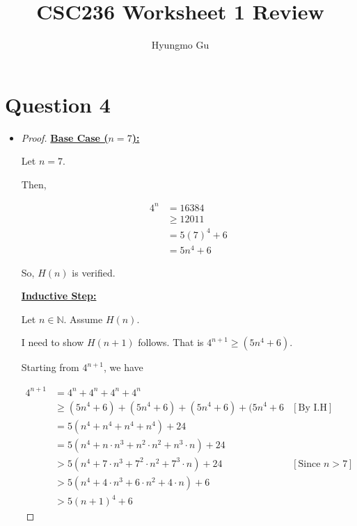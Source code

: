 \documentclass[12pt]{article}
\begin{document}
\title{CSC236 Worksheet 1 Review}
\author{Hyungmo Gu}
\maketitle

\section*{Question 4}
\begin{itemize}
    \item

    \begin{proof}
    \underline{\textbf{Base Case ($n = 7$):}}

    \bigskip

    Let $n = 7$.

    \bigskip

    Then,

    \begin{align}
        4^n &= 16384\\
        &\geq 12011\\
        &= 5(7)^4 + 6\\
        &= 5n^4 + 6
    \end{align}

    \bigskip

    So, $H(n)$ is verified.

    \bigskip

    \underline{\textbf{Inductive Step:}}

    \bigskip

    Let $n \in \mathbb{N}$. Assume $H(n)$.

    \bigskip

    I need to show $H(n+1)$ follows. That is $4^{n+1} \geq (5n^4 + 6)$.

    \bigskip

    Starting from $4^{n+1}$, we have

    \begin{align}
        4^{n+1} &= 4^n + 4^n + 4^n + 4^n\\
        &\geq (5n^4 + 6) + (5n^4 + 6) + (5n^4 + 6) + (5n^4 + 6 & [\text{By I.H}]\\
        &= 5(n^4 + n^4 + n^4 + n^4) + 24\\
        &= 5(n^4 + n \cdot n^3 + n^2 \cdot n^2 + n^3 \cdot n) + 24\\
        &> 5(n^4 + 7 \cdot n^3 + 7^2 \cdot n^2 + 7^3 \cdot n) + 24 & [\text{Since $n > 7$}]\\
        &> 5(n^4 + 4 \cdot n^3 + 6 \cdot n^2 + 4 \cdot n) + 6\\
        &> 5(n+1)^4 + 6
    \end{align}


\end{proof}
\end{itemize}
\end{document}
